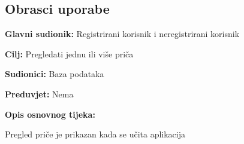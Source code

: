 			\subsection{Obrasci uporabe}
				
				
			
				
					\noindent {}
					\begin{packed_item}

						\item \textbf{Glavni sudionik: }Registrirani korisnik i neregistrirani korisnik
						\item  \textbf{Cilj:} Pregledati jednu ili više priča
						\item  \textbf{Sudionici:} Baza podataka
						\item  \textbf{Preduvjet:} Nema
						\item  \textbf{Opis osnovnog tijeka:}
						
						\item[] \begin{packed_enum}
							
							\item Pregled priče je prikazan kada se učita aplikacija
						\end{packed_enum}
		
					\end{packed_item}
				
